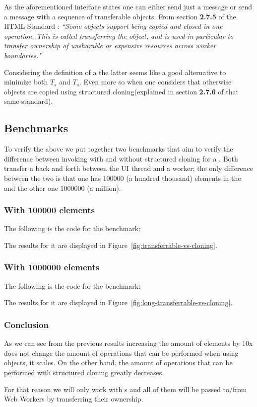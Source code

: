 As the aforementioned interface states one can either send just a message or send a message with a sequence of transferable objects. From section \textbf{2.7.5} of the HTML Standard \cite{html-whatwg}:
\textit{``Some objects support being copied and closed in one operation. This is called transferring the object, and is used in particular to transfer ownership of unsharable or expensive resources across worker boundaries."}

Considering the definition of a  the latter seems like a good alternative to minimize both \(T_{s}\) and \(T_{s}\). Even more so when one considers that otherwise objects are copied using structured cloning(explained in section \textbf{2.7.6} of that same standard).

\subsection{Benchmarks}
To verify the above we put together two benchmarks that aim to verify the difference between invoking  with and without structured cloning for a \ttarray{}. Both transfer a \ttarray{} back and forth between the UI thread and a worker; the only difference between the two is that one has 100000 (a hundred thousand) elements in the \ttarray{} and the other one 1000000 (a million).

\subsubsection{With 100000 elements}
The following is the code for the benchmark:

The results for it are displayed in Figure~\ref{fig:transferrable-vs-cloning}.

\subsubsection{With 1000000 elements}
The following is the code for the benchmark:

The results for it are displayed in Figure~\ref{fig:long-transferrable-vs-cloning}.

\subsubsection{Conclusion}
As we can see from the previous results increasing the amount of elements by 10x does not change the amount of operations that can be performed when using  objects, it scales. On the other hand, the amount of operations that can be performed with structured cloning greatly decreases.

For that reason we will only work with {\ttarray{}}s and all of them will be passed to/from Web Workers by transferring their ownership.

\pagebreak